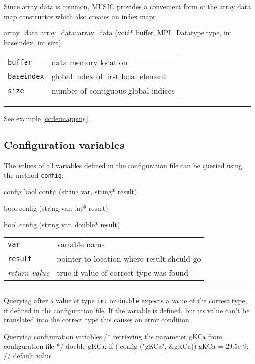 \documentclass[a4paper]{report}
\makeatletter
\newenvironment{parameters}%
{\begin{tabular}{@{\hspace{2em}}lp{0.6\textwidth}}}%
{\end{tabular}\par\vspace{1mm}\par\hrule\par\vspace{5mm}}
\makeatother
\begin{document}
Since array data is common, MUSIC provides a convenient form of the
array data map constructor which also creates an index map:

\begin{head}{array_data}
  array_data::array_data (void* buffer,
                          MPI_Datatype type,
                          int  baseindex,
                          int size)
\end{head}
\begin{parameters}
  \lstinline|buffer|    & data memory location \\
  \lstinline|baseindex| & global index of first local element \\
  \lstinline|size|      & number of contiguous global indices \\
\end{parameters}

See example \ref{code:mapping}.

\subsection{Configuration variables}

The values of all variables defined in the configuration file can be
queried using the method \lstinline|config|.

\begin{head}{config}
  bool config (string var, string* result)

  bool config (string var, int* result)

  bool config (string var, double* result)
\end{head}
\begin{parameters}
  \lstinline|var|     & variable name \\
  \lstinline|result|  & pointer to location where result should go \\
  \emph{return value} & true if value of correct type was found \\
\end{parameters}

Querying after a value of type \lstinline|int| or \lstinline|double|
expects a value of the correct type, if defined in the configuration
file.  If the variable is defined, but its value can't be translated
into the correct type this causes an error condition.

\begin{code}{Querying configuration variables}
/* retrieving the parameter gKCa from configuration file */
double gKCa;
if (!config ("gKCa", &gKCa))
  gKCa = 29.5e-9; // default value
\end{code}
\end{document}
